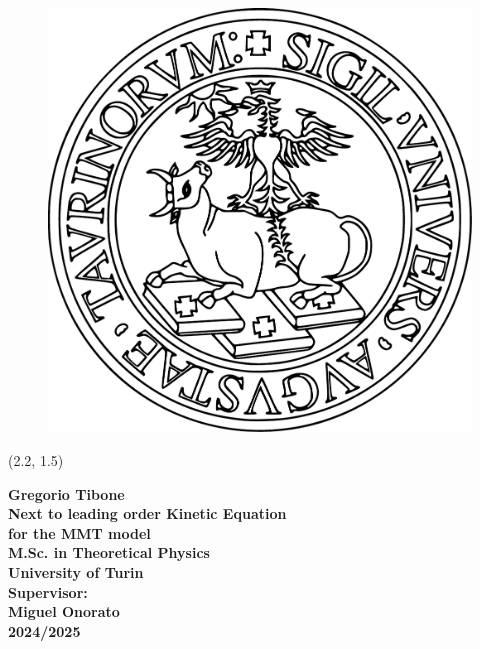 \begin{titlepage}
    \thispagestyle{empty}
    \begin{figure}[!htb]
        \raggedleft
        \vspace{2cm}
        \hspace{1cm}
        \includegraphics[width=2\textwidth]{images/Unito-logo.pdf}  
    \end{figure}
    
    \begin{textblock}{15}(2.2, 1.5)  %
        \raggedright
        \large \bfseries Gregorio Tibone \hspace{8cm} \href{https://brawlhub.co/brawlers/buzz-brawl-stars/}{\mbox{\hspace{0mm}}}\\
        \Huge Next to leading order Kinetic Equation\\ for the MMT model \\[1cm] %
        \Large M.Sc. in Theoretical Physics \\
        \Large University of Turin \\[1cm]  
        \large Supervisor: \\
        \large Miguel Onorato \\[1cm]
        \normalsize 2024/2025  \\
    \end{textblock}
\end{titlepage}
